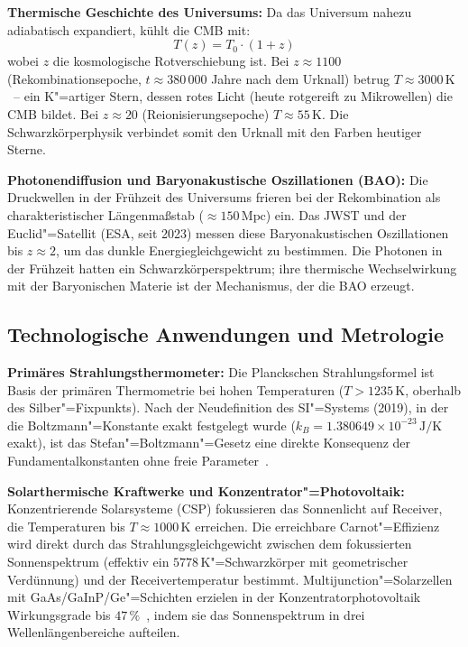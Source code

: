 ﻿\documentclass[a4paper,12pt]{article}
\theoremstyle{definition}
\begin{document}
\textbf{Thermische Geschichte des Universums:}
Da das Universum nahezu adiabatisch expandiert, kühlt die CMB mit:
\[
    T(z) = T_0 \cdot (1 + z)
\]
wobei $z$ die kosmologische Rotverschiebung ist. Bei $z \approx 1100$
(Rekombinationsepoche, $t \approx 380\,000$ Jahre nach dem Urknall)
betrug $T \approx 3000\,\text{K}$~-- ein K"=artiger Stern, dessen rotes
Licht (heute rotgereift zu Mikrowellen) die CMB bildet. Bei $z \approx 20$
(Reionisierungsepoche) $T \approx 55\,\text{K}$. Die Schwarzkörperphysik
verbindet somit den Urknall mit den Farben heutiger Sterne.

\textbf{Photonendiffusion und Baryonakustische Oszillationen (BAO):}
Die Druckwellen in der Frühzeit des Universums frieren bei der
Rekombination als charakteristischer Längenmaßstab ($\approx 150\,\text{Mpc}$)
ein. Das JWST und der Euclid"=Satellit (ESA, seit 2023) messen diese
Baryonakustischen Oszillationen bis $z \approx 2$, um das dunkle
Energiegleichgewicht zu bestimmen. Die Photonen in der Frühzeit hatten
ein Schwarzkörperspektrum; ihre thermische Wechselwirkung mit der
Baryonischen Materie ist der Mechanismus, der die BAO erzeugt.

\subsection{Technologische Anwendungen und Metrologie}

\textbf{Primäres Strahlungsthermometer:}
Die Planckschen Strahlungsformel ist Basis der primären Thermometrie
bei hohen Temperaturen ($T > 1235\,\text{K}$, oberhalb des
Silber"=Fixpunkts). Nach der Neudefinition des SI"=Systems (2019),
in der die Boltzmann"=Konstante exakt festgelegt wurde
($k_B = 1.380649 \times 10^{-23}\,\text{J/K}$ exakt), ist das
Stefan"=Boltzmann"=Gesetz eine direkte Konsequenz der Fundamentalkonstanten
ohne freie Parameter~\cite{nist2019}.

\textbf{Solarthermische Kraftwerke und Konzentrator"=Photovoltaik:}
Konzentrierende Solarsysteme (CSP) fokussieren das Sonnenlicht auf Receiver,
die Temperaturen bis $T \approx 1000\,\text{K}$ erreichen. Die
erreichbare Carnot"=Effizienz wird direkt durch das Strahlungsgleichgewicht
zwischen dem fokussierten Sonnenspektrum (effektiv ein $5778\,\text{K}$"=Schwarzkörper
mit geometrischer Verdünnung) und der Receivertemperatur bestimmt.
Multijunction"=Solarzellen mit GaAs/GaInP/Ge"=Schichten erzielen
in der Konzentratorphotovoltaik Wirkungsgrade bis $47\,\%$~\cite{green2023},
indem sie das Sonnenspektrum in drei Wellenlängenbereiche aufteilen.
\end{document}
